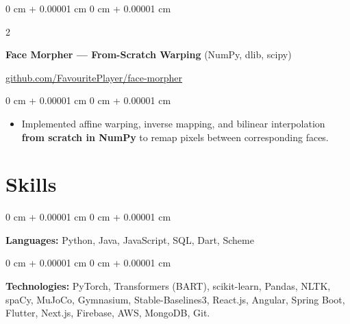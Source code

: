 \documentclass[10pt, letterpaper]{article}
\newenvironment{highlights}{
    \begin{itemize}[
        topsep=0.3 cm,
        parsep=0.06 cm,
        partopsep=0pt,
        itemsep=0.02 cm,
        leftmargin=0 cm + 10pt
    ]
}{
    \end{itemize}
} %
\newenvironment{onecolentry}{
    \begin{adjustwidth}{
        0 cm + 0.00001 cm
    }{
        0 cm + 0.00001 cm
    }
}{
    \end{adjustwidth}
} %
\newenvironment{extendedtwocolentry}[2][]{
    \onecolentry
    \def\secondColumn{#2}
    \setcolumnwidth{\fill, 8 cm}
    \begin{paracol}{2}
}{
    \switchcolumn \raggedleft \secondColumn
    \end{paracol}
    \endonecolentry
}
\begin{document}
        \begin{extendedtwocolentry}{
            \href{https://github.com/FavouritePlayer/face-morpher}{github.com/FavouritePlayer/face-morpher}
        }
            \textbf{Face Morpher — From-Scratch Warping} (NumPy, dlib, scipy)
        \end{extendedtwocolentry}

        \vspace{0.075 cm}
        \begin{onecolentry}
            \begin{highlights}
                \item Implemented affine warping, inverse mapping, and bilinear interpolation \textbf{from scratch in NumPy} to remap pixels between corresponding faces.
            \end{highlights}
        \end{onecolentry}

    \section{Skills}

        \begin{onecolentry}
            \textbf{Languages:} Python, Java, JavaScript, SQL, Dart, Scheme
        \end{onecolentry}

        \vspace{0.075 cm}

        \begin{onecolentry}
            \textbf{Technologies:} PyTorch, Transformers (BART), scikit-learn, Pandas, NLTK, spaCy, MuJoCo, Gymnasium, Stable-Baselines3, React.js, Angular, Spring Boot, Flutter, Next.js, Firebase, AWS, MongoDB, Git.
        \end{onecolentry}
\end{document}
